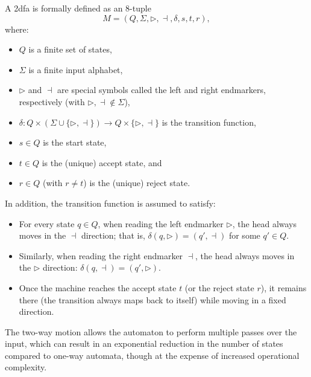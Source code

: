 \begin{definition}
A \gls{2dfa} is formally defined as an 8-tuple 
\[
M = (Q, \Sigma, \triangleright, \dashv, \delta, s, t, r),
\]
where:
\begin{itemize}
  \item \(Q\) is a finite set of states,
  \item \(\Sigma\) is a finite input alphabet,
  \item \(\triangleright\) and \(\dashv\) are special symbols called the left and right endmarkers, respectively (with \(\triangleright,\dashv \notin \Sigma\)),
  \item \(\delta: Q \times (\Sigma \cup \{\triangleright, \dashv\}) \to Q \times \{\triangleright,\dashv\}\) is the transition function,
  \item \(s\in Q\) is the start state,
  \item \(t\in Q\) is the (unique) accept state, and
  \item \(r\in Q\) (with \(r\neq t\)) is the (unique) reject state.
\end{itemize}
In addition, the transition function is assumed to satisfy:
\begin{itemize}
  \item For every state \(q\in Q\), when reading the left endmarker \(\triangleright\), the head always moves in the \(\dashv\) direction; that is, \(\delta(q,\triangleright) = (q', \dashv)\) for some \(q'\in Q\).
  \item Similarly, when reading the right endmarker \(\dashv\), the head always moves in the \(\triangleright\) direction: \(\delta(q,\dashv) = (q', \triangleright)\).
  \item Once the machine reaches the accept state \(t\) (or the reject state \(r\)), it remains there (the transition always maps back to itself) while moving in a fixed direction.
\end{itemize}
\end{definition}

\begin{remark}
The two-way motion allows the automaton to perform multiple passes over the input, which can result in an exponential reduction in the number of states compared to one-way automata, though at the expense of increased operational complexity.
\end{remark}

